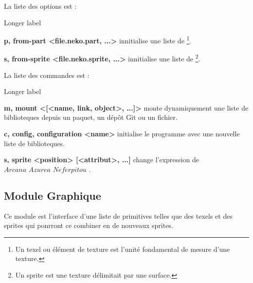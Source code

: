 \documentclass{report}
\newcommand{\name}{\textit{Arcana Azurea Neferpitou}}
\begin{document}
La liste des options est :
\begin{labeling}{Longer label\quad}
	\item[\textbf{
		\textendash p,
		\textendash\textendash from-part <file.neko.part, ...>}] innitialise une liste de 
				\footnote{ Un texel ou élément de texture est l'unité fondamental de mesure d'une texture. }.
	\item[\textbf{
		\textendash s,
		\textendash\textendash from-sprite <file.neko.sprite, ...>}] innitialise une liste de
				\footnote{ Un sprite est une texture délimitait par une surface. }.
\end{labeling}

La liste des commandes est :

\begin{labeling}{Longer label\quad}
	\item[\textbf{
		\textendash m,
		\textendash\textendash mount <[<name, link, object>, ...]>
	}] monte dynamiquement une liste de biblioteques depuis un paquet, un dépôt Git ou un fichier.
	\item[\textbf{
		\textendash c,
		\textendash\textendash config,
		\textendash\textendash configuration <name>
	}] initialise le programme avec une nouvelle liste de biblioteques.
	\item[\textbf{
		\textendash s,
		\textendash\textendash sprite <position> [<attribut>, ...]
	}] change l'expression de $\name$ .
\end{labeling}

\subsection{Module Graphique}

Ce module est l'interface d'une liste de primitives telles que des texels et des sprites qui ponrront ce combiner en de nouveaux sprites.
\end{document}
